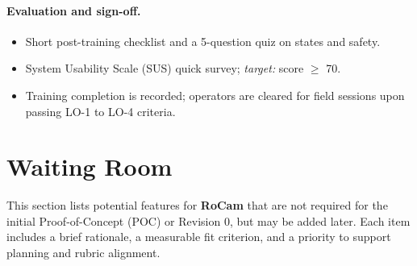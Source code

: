 \documentclass[12pt]{article}
\begin{document}
\paragraph{Evaluation and sign-off.}
\begin{itemize}
  \item Short post-training checklist and a 5-question quiz on states and safety.
  \item System Usability Scale (SUS) quick survey; \emph{target:} score $\geq$ 70.
  \item Training completion is recorded; operators are cleared for field sessions upon
        passing LO-1 to LO-4 criteria.
\end{itemize}

\section{Waiting Room}
\label{sec:waiting-room}

This section lists potential features for \textbf{RoCam} that are not required
for the initial Proof-of-Concept (POC) or Revision 0, but may be added later.
Each item includes a brief rationale, a measurable fit criterion, and a
priority to support planning and rubric alignment.
\end{document}
